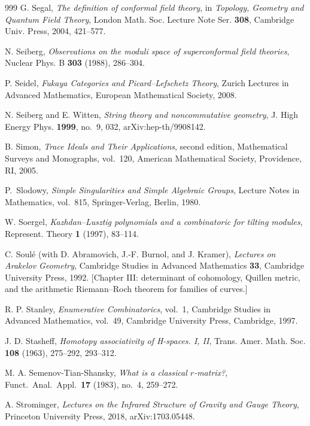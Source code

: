 \begin{thebibliography}{999}
G. Segal, \emph{The definition of conformal field theory}, in \emph{Topology, Geometry and Quantum Field Theory}, London Math. Soc. Lecture Note Ser. \textbf{308}, Cambridge Univ. Press, 2004, 421--577.

N. Seiberg, \emph{Observations on the moduli space of superconformal field theories}, Nuclear Phys. B \textbf{303} (1988), 286--304.

P. Seidel, \emph{Fukaya Categories and {P}icard--{L}efschetz Theory}, Zurich Lectures in Advanced Mathematics, European Mathematical Society, 2008.

N. Seiberg and E. Witten, \emph{String theory and noncommutative geometry}, J. High Energy Phys. \textbf{1999}, no.~9, 032, arXiv:hep-th/9908142.

B. Simon, \emph{Trace Ideals and Their Applications}, second edition, Mathematical Surveys and Monographs, vol.~120, American Mathematical Society, Providence, RI, 2005.

P.~Slodowy, \emph{Simple Singularities and Simple Algebraic Groups}, Lecture Notes in Mathematics, vol.~815, Springer-Verlag, Berlin, 1980.

W. Soergel, \emph{Kazhdan--Lusztig polynomials and a combinatoric for tilting modules}, Represent. Theory \textbf{1} (1997), 83--114.

C. Soul\'e (with D. Abramovich, J.-F. Burnol, and J. Kramer),
\emph{Lectures on Arakelov Geometry}, Cambridge Studies in Advanced
Mathematics \textbf{33}, Cambridge University Press, 1992.
[Chapter III: determinant of cohomology, Quillen metric, and the
arithmetic Riemann--Roch theorem for families of curves.]

R. P. Stanley, \emph{Enumerative Combinatorics}, vol.~1, Cambridge Studies in Advanced Mathematics, vol.~49, Cambridge University Press, Cambridge, 1997.

J. D. Stasheff, \emph{Homotopy associativity of H-spaces. I, II}, Trans. Amer. Math. Soc. \textbf{108} (1963), 275--292, 293--312.

M. A. Semenov-Tian-Shansky, \emph{What is a classical $r$-matrix?}, Funct.\ Anal.\ Appl.\ \textbf{17} (1983), no.~4, 259--272.

A. Strominger, \emph{Lectures on the Infrared Structure of Gravity and Gauge Theory}, Princeton University Press, 2018, arXiv:1703.05448.


\end{thebibliography}
